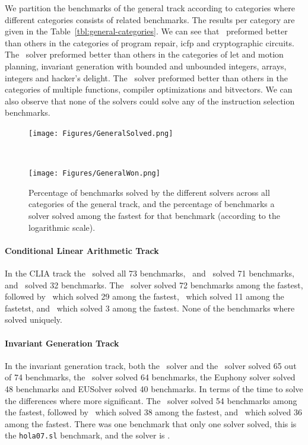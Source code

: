 We partition the benchmarks of the general track according to categories where different categories consists of related benchmarks. The results per category are given in the Table~\ref{tbl:general-categories}. We can see that \eusolvernew\ preformed better than others in the categories of program repair, icfp and cryptographic circuits. The \cvcnew\ solver preformed better than others in the categories of let and motion planning, invariant generation with bounded and unbounded integers, arrays, integers and hacker's delight. The \euphony\ solver preformed better than others in the categories of  multiple functions, compiler optimizations and bitvectors. We can also observe that none of the solvers could solve any of the instruction selection benchmarks. 




\begin{figure}
	\begin{center}
		\begin{minipage}{1\textwidth}
			\centering
			\texttt{[image: Figures/GeneralSolved.png]}
		\end{minipage}
		\\
		\vspace{2mm}
		\begin{minipage}{1\textwidth}
			\centering
			\texttt{[image: Figures/GeneralWon.png]}
		\end{minipage}
	\end{center}
	\caption{Percentage of benchmarks solved by the different solvers across all categories of the general track, and the percentage of benchmarks a solver solved among the fastest for that benchmark (according to the logarithmic scale).  }	
\end{figure}	


\paragraph{Conditional Linear Arithmetic Track}
In the CLIA track the \cvcnew\ solved all 73 benchmarks, \euphony\ and \eusolvernew\ solved 71 benchmarks, and \dryd\ solved 32 benchmarks. The \cvcnew\ solver solved 72 benchmarks among the fastest, followed by \eusolvernew\ which solved 29 among the fastest, \euphony\ which solved 11 among the fastetst, and \dryd\ which solved 3 among the fastest. None of the benchmarks where solved uniquely.

\paragraph{Invariant Generation Track}
In the invariant generation  track, both the \lig\ solver and the \cvcnew\ solver solved 65 out of 74 benchmarks, the \dryd\ solver solved 64 benchmarks, the Euphony solver solved 48 benchmarks and EUSolver solved 40 benchmarks. In terms of the time to solve the differences where more significant. The \lig\ solver solved 54 benchmarks among the fastest, followed by \cvcnew\ which solved 38 among the fastest, and \dryd\
which solved 36 among the fastest. There was one benchmark that only one solver solved, this is the \texttt{hola07.sl} benchmark, and the solver is \lig. 


